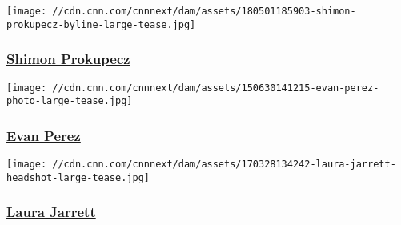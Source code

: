 \href{/profiles/shimon-prokupecz-profile}{}

\texttt{[image: //cdn.cnn.com/cnnnext/dam/assets/180501185903-shimon-prokupecz-byline-large-tease.jpg]}

\hypertarget{shimon-prokupecz}{%
\subsubsection{\texorpdfstring{\href{/profiles/shimon-prokupecz-profile}{Shimon
Prokupecz}}{Shimon Prokupecz}}\label{shimon-prokupecz}}

\href{/profiles/evan-perez-profile}{}

\texttt{[image: //cdn.cnn.com/cnnnext/dam/assets/150630141215-evan-perez-photo-large-tease.jpg]}

\hypertarget{evan-perez}{%
\subsubsection{\texorpdfstring{\href{/profiles/evan-perez-profile}{Evan
Perez}}{Evan Perez}}\label{evan-perez}}

\href{/profiles/laura-jarrett}{}

\texttt{[image: //cdn.cnn.com/cnnnext/dam/assets/170328134242-laura-jarrett-headshot-large-tease.jpg]}

\hypertarget{laura-jarrett}{%
\subsubsection{\texorpdfstring{\href{/profiles/laura-jarrett}{Laura
Jarrett}}{Laura Jarrett}}\label{laura-jarrett}}

